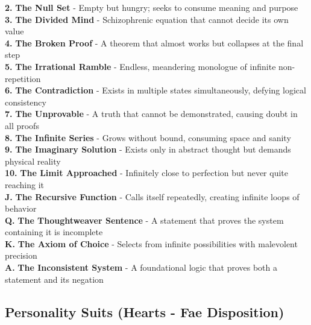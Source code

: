 \documentclass[11pt]{article}
\begin{document}
\textbf{2.} \textbf{The Null Set} - Empty but hungry; seeks to consume meaning and purpose \\
\textbf{3.} \textbf{The Divided Mind} - Schizophrenic equation that cannot decide its own value \\
\textbf{4.} \textbf{The Broken Proof} - A theorem that almost works but collapses at the final step \\
\textbf{5.} \textbf{The Irrational Ramble} - Endless, meandering monologue of infinite non-repetition \\
\textbf{6.} \textbf{The Contradiction} - Exists in multiple states simultaneously, defying logical consistency \\
\textbf{7.} \textbf{The Unprovable} - A truth that cannot be demonstrated, causing doubt in all proofs \\
\textbf{8.} \textbf{The Infinite Series} - Grows without bound, consuming space and sanity \\
\textbf{9.} \textbf{The Imaginary Solution} - Exists only in abstract thought but demands physical reality \\
\textbf{10.} \textbf{The Limit Approached} - Infinitely close to perfection but never quite reaching it \\
\textbf{J.} \textbf{The Recursive Function} - Calls itself repeatedly, creating infinite loops of behavior \\
\textbf{Q.} \textbf{The Thoughtweaver Sentence} - A statement that proves the system containing it is incomplete \\
\textbf{K.} \textbf{The Axiom of Choice} - Selects from infinite possibilities with malevolent precision \\
\textbf{A.} \textbf{The Inconsistent System} - A foundational logic that proves both a statement and its negation

\subsection*{Personality Suits (Hearts - Fae Disposition)}
\end{document}
